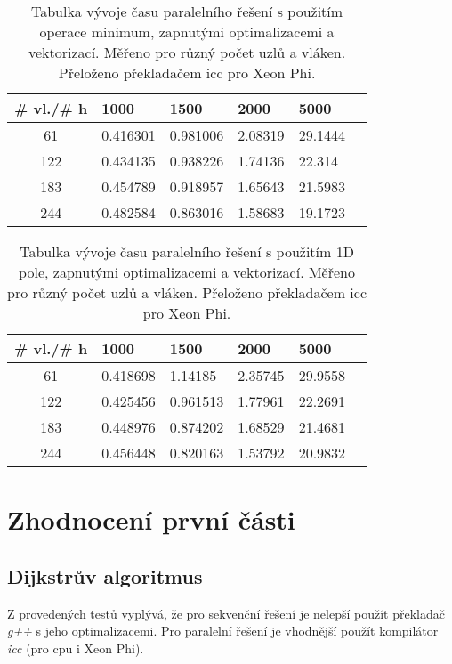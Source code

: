 \documentclass[a4paper,11pt]{article}
\begin{document}
  
      \begin{table}[ht]
  \begin{center}
   \begin{tabular}{|c|l|l|l|l|l|}
    \hline 
    \# vl./\# h & 1000 & 1500 & 2000 & 5000 \\
   \hline 
   \hline 
   61 & 0.416301 & 0.981006 & 2.08319 & 29.1444 \\
   \hline
    122 & 0.434135 & 0.938226 & 1.74136 & 22.314 \\
   \hline
    183 & 0.454789 & 0.918957 & 1.65643 & 21.5983 \\
   \hline
    244 & 0.482584 & 0.863016 & 1.58683 & 19.1723 \\
   \hline        
    \end{tabular}
   \caption{Tabulka vývoje času paralelního řešení s použitím operace minimum, zapnutými optimalizacemi a vektorizací. Měřeno pro různý počet uzlů a vláken. Přeloženo 
   překladačem icc pro Xeon Phi.} 
   \label{tab.tab25}
  \end{center}   
  \end{table}

      \begin{table}[ht]
  \begin{center}
   \begin{tabular}{|c|l|l|l|l|l|}
    \hline 
    \# vl./\# h & 1000 & 1500 & 2000 & 5000 \\
   \hline 
   \hline 
   61 & 0.418698 & 1.14185 & 2.35745 & 29.9558 \\
   \hline
    122 & 0.425456 & 0.961513 & 1.77961 & 22.2691 \\
   \hline
    183 & 0.448976 & 0.874202 & 1.68529 & 21.4681 \\
   \hline
    244 & 0.456448 & 0.820163 & 1.53792 & 20.9832 \\
   \hline        
   \hline
    \end{tabular}
   \caption{Tabulka vývoje času paralelního řešení s použitím 1D pole, zapnutými optimalizacemi a vektorizací. Měřeno pro různý počet uzlů a vláken. Přeloženo 
   překladačem icc pro Xeon Phi.} 
   \label{tab.tab29}
  \end{center}   
  \end{table}

  \clearpage
 \section{Zhodnocení první části}
 \subsection{Dijkstrův algoritmus}
 Z provedených testů vyplývá, že pro sekvenční řešení je nelepší použít překladač \textit{g++} s jeho optimalizacemi.
 Pro paralelní řešení je vhodnější použít kompilátor \textit{icc} (pro cpu i Xeon Phi).
 
\end{document}
